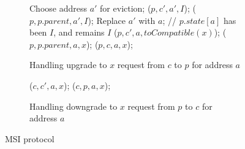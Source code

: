 \begin{figure}

\begin{subfigure}{\linewidth}
\begin{boxedminipage}{\linewidth}
\begin{algorithmic}
    \State Choose address $a'$ for eviction;
      \State \call{} \dReqL($p , c', a', I$);
    \EndFor
    \State \call{} \dResp($p , p.parent, a', I$);
    \State Replace $a'$ with $a$;
    \State // $p.state[a]$ has been $I$, and remains $I$
  \EndIf
    \State \call{} \dReqL($p , c', a, toCompatible(x)$);
  \EndFor
  \State \call{} \uReqL($p , p.parent, a, x$);
  \State \call{} \uResp($p , c, a, x$);
\EndProc
\end{algorithmic}
\end{boxedminipage}
\caption{Handling upgrade to $x$ request from $c$ to $p$ for address $a$}
\label{uReq}
\end{subfigure}

\begin{subfigure}{\linewidth}
\begin{boxedminipage}{\linewidth}
\begin{algorithmic}
    \State \dReqL($c , c', a, x$);
  \EndFor
  \State \dResp($c , p, a, x$);
\EndProc
\end{algorithmic}
\end{boxedminipage}
\caption{Handling downgrade to $x$ request from $p$ to $c$ for address $a$}
\label{dReq}
\end{subfigure}

\caption{MSI protocol}
\label{msi}
\end{figure}

